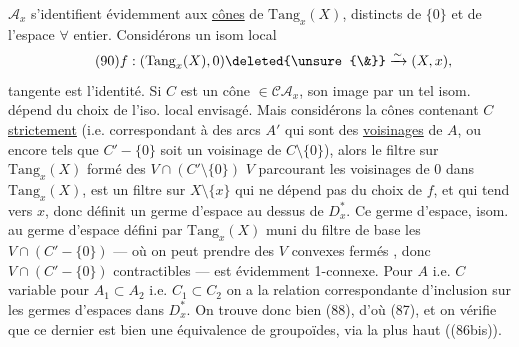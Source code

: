 $\mathcal A_x$ s'identifient évidemment aux \uline{cônes}
de $\mathrm{Tang}_x(X)$, 
distincts de $\{0\}$ et de l'espace
 $\forall$ entier.
Considérons un isom local
\[
\tag{90}
f:(\mathrm{Tang}_x(X),0)\deleted{\unsure{\&}}
\xrightarrow{\sim}(X,x),
\]
 tangente est l'identité.
 Si $C$ est un cône $\in\mathcal C\mathcal A_x$,
son image par un tel isom. dépend du choix de l'iso. local envisagé.
Mais considérons la 
 cônes
 contenant
\deleted{$\unsure{\in}$} $C$ \uline{strictement}
(i.e. correspondant à des arcs $A'$ qui sont des \uline{voisinages}
de $A$, ou encore tels que $C'-\{0\}$ soit un voisinage de
$C\setminus\{0\}$), alors le
filtre sur $\mathrm{Tang}_x(X)$ formé des
$V\cap(C'\setminus\{0\})$  $V$
parcourant les voisinages de $0$ dans $\mathrm{Tang}_x(X)$,
est un filtre sur $X\setminus\{x\}$ qui ne dépend pas du choix de $f$,
et qui tend vers $x$, donc définit un germe d'espace
au dessus de  $D_x^*$.
Ce germe d'espace, 
isom. au germe d'espace défini par $\mathrm{Tang}_x(X)$ muni du filtre
de base les $V\cap(C'-\{0\})$ --- où on peut prendre des $V$
convexes fermés , donc
$V\cap(C'-\{0\})$ contractibles --- est évidemment 1-connexe.
Pour $A$ i.e. $C$ variable  pour $A_1\subset A_2$
i.e. $C_1\subset C_2$ on a la relation correspondante d'inclusion
sur les germes d'espaces dans $D_x^*$.
On trouve donc bien (88), d'où (87), et on vérifie
que ce dernier est bien une équivalence de 
groupoïdes, via la 
  plus haut ((86bis)).
